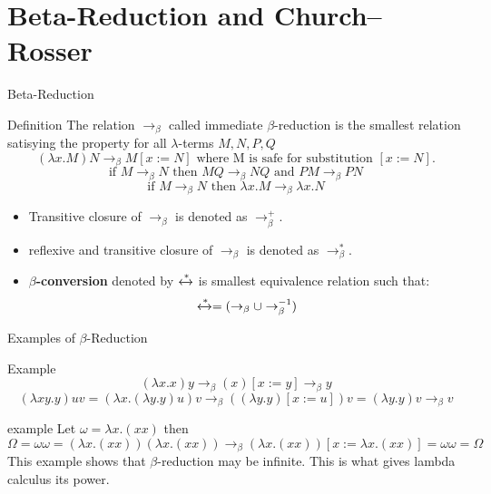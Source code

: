 \documentclass{beamer}
\begin{document}
\section{Beta-Reduction and Church–Rosser}
\begin{frame}{Beta-Reduction}
  \begin{block}{Definition}
    The relation \(\rightarrow_\beta\) called immediate $\beta$-reduction is the smallest relation satisying the property for all $\lambda$-terms \(M,N,P,Q\)
    \[
      (\lambda x.M)N \rightarrow_\beta M[x := N] \text{ where M is safe for substitution \([x := N]\).}
    \]
    \[
      \text{if } M \rightarrow_\beta N \text{ then } MQ \rightarrow_\beta NQ \text{ and } PM \rightarrow_\beta PN
    \]
    \[
      \text{if } M \rightarrow_\beta N \text{ then } \lambda x.M \rightarrow_\beta \lambda x.N
    \]
  \end{block}
  \begin{itemize}
    \item Transitive closure of $\rightarrow_\beta$ is denoted as $\rightarrow^+_\beta$.
    \item reflexive and transitive closure of $\rightarrow_\beta$ is denoted as $\rightarrow^*_\beta$.
    \item \textbf{\(\beta\)-conversion} denoted by $\xleftrightarrow{*}$ is smallest equivalence relation such that:
      \[
        \xleftrightarrow{*} = (\rightarrow_\beta \cup \rightarrow_\beta^{-1})
      \]
  \end{itemize}
  

\end{frame}

\begin{frame}{Examples of $\beta$-Reduction}
  \begin{block}{Example}
    \[
      (\lambda x.x) y \rightarrow_\beta (x)[x := y] \rightarrow_\beta y
    \]
    \[
      (\lambda xy.y)uv = (\lambda x.(\lambda y.y)u)v \rightarrow_\beta ((\lambda y.y)[x:=u])v = (\lambda y.y)v \rightarrow_\beta v 
    \]
  \end{block}
  \begin{block}{example}
    Let \(\omega = \lambda x.(xx)\) then
    \[
      \Omega = \omega \omega = (\lambda x.(xx))(\lambda x.(xx)) \rightarrow_\beta (\lambda x.(xx))[x := \lambda x.(xx)] = \omega\omega =\Omega
    \]
    This example shows that \(\beta\)-reduction may be infinite. This is what gives lambda calculus its power.
  \end{block}
\end{frame}
\end{document}
